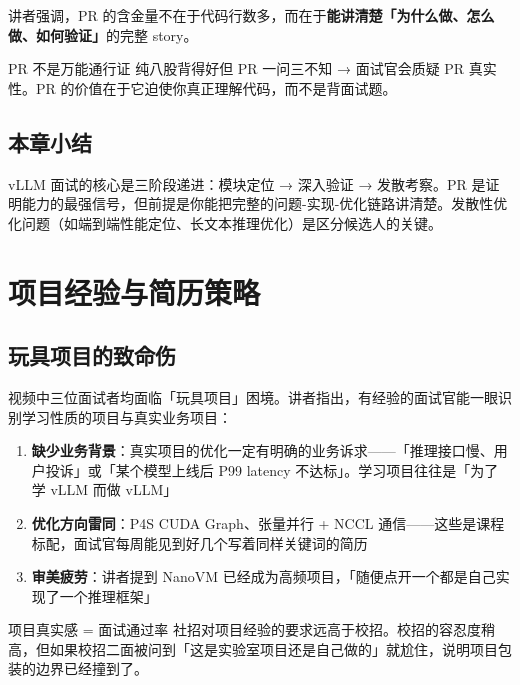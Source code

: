 \documentclass[a4paper]{article}
\begin{document}
讲者强调，PR 的含金量不在于代码行数多，而在于\textbf{能讲清楚「为什么做、怎么做、如何验证」}的完整 story。

\begin{warningbox}{PR 不是万能通行证}
  纯八股背得好但 PR 一问三不知 → 面试官会质疑 PR 真实性。PR 的价值在于它迫使你真正理解代码，而不是背面试题。
\end{warningbox}

\subsection{本章小结}

vLLM 面试的核心是三阶段递进：模块定位 → 深入验证 → 发散考察。PR 是证明能力的最强信号，但前提是你能把完整的问题-实现-优化链路讲清楚。发散性优化问题（如端到端性能定位、长文本推理优化）是区分候选人的关键。


\section{项目经验与简历策略}

\subsection{玩具项目的致命伤}

视频中三位面试者均面临「玩具项目」困境。讲者指出，有经验的面试官能一眼识别学习性质的项目与真实业务项目：

\begin{enumerate}
  \item \textbf{缺少业务背景}：真实项目的优化一定有明确的业务诉求——「推理接口慢、用户投诉」或「某个模型上线后 P99 latency 不达标」。学习项目往往是「为了学 vLLM 而做 vLLM」
  \item \textbf{优化方向雷同}：P4S CUDA Graph、张量并行 + NCCL 通信——这些是课程标配，面试官每周能见到好几个写着同样关键词的简历
  \item \textbf{审美疲劳}：讲者提到 NanoVM 已经成为高频项目，「随便点开一个都是自己实现了一个推理框架」

\end{enumerate}

\begin{importantbox}{项目真实感 = 面试通过率}
  社招对项目经验的要求远高于校招。校招的容忍度稍高，但如果校招二面被问到「这是实验室项目还是自己做的」就尬住，说明项目包装的边界已经撞到了。
\end{importantbox}
\end{document}
